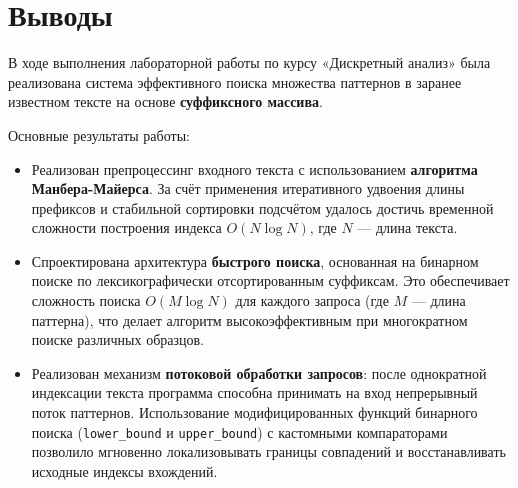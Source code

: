 \section{Выводы}

В ходе выполнения лабораторной работы по курсу «Дискретный анализ» была реализована система эффективного поиска множества паттернов в заранее известном тексте на основе \textbf{суффиксного массива}.

Основные результаты работы:
\begin{itemize}
    \item Реализован препроцессинг входного текста с использованием \textbf{алгоритма Манбера-Майерса}. За счёт применения итеративного удвоения длины префиксов и стабильной сортировки подсчётом удалось достичь временной сложности построения индекса $O(N \log N)$, где $N$ — длина текста.
    \item Спроектирована архитектура \textbf{быстрого поиска}, основанная на бинарном поиске по лексикографически отсортированным суффиксам. Это обеспечивает сложность поиска $O(M \log N)$ для каждого запроса (где $M$ — длина паттерна), что делает алгоритм высокоэффективным при многократном поиске различных образцов.
    \item Реализован механизм \textbf{потоковой обработки запросов}: после однократной индексации текста программа способна принимать на вход непрерывный поток паттернов. Использование модифицированных функций бинарного поиска (\texttt{lower\_bound} и \texttt{upper\_bound}) с кастомными компараторами позволило мгновенно локализовывать границы совпадений и восстанавливать исходные индексы вхождений.
\end{itemize}

\pagebreak